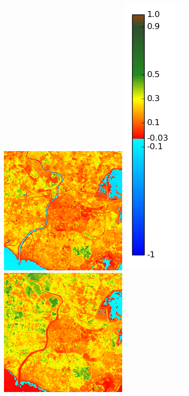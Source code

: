 \documentclass{book}
\begin{document}
\begin{figure}[H]
\centerline{
\includegraphics[scale=0.4]{images/Agde/03_ndvi.png}
\includegraphics[scale=0.2]{images/colormap.png}
\includegraphics[scale=0.4]{images/Agde/04_ndvi.png}
}
\end{figure}
\end{document}
